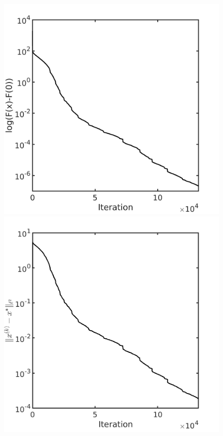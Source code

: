 \documentclass[final,1p,times]{elsarticle}
\begin{document}
\begin{figure}[!htbp]
	\centering
	  \includegraphics[scale=0.18]{../figures/arwhead640D.png}
	  \includegraphics[scale=0.174]{../figures/arwhead640D_dist.png}
\end{figure}
\end{document}
